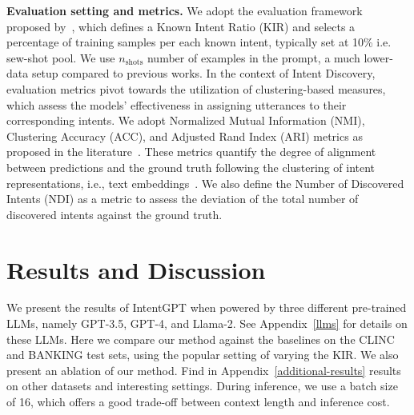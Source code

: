 \documentclass[11pt]{article}
\begin{document}
\vspace{3px}
\textbf{Evaluation setting and metrics.} We adopt the evaluation framework proposed by~\citet{zhang2021discovering}, which defines a Known Intent Ratio (KIR) and selects a percentage of training samples per each known intent, typically set at 10\% i.e. sew-shot pool. We use $n_{\text{shots}}$ number of examples in the prompt, a much lower-data setup compared to previous works. In the context of Intent Discovery, evaluation metrics pivot towards the utilization of clustering-based measures, which assess the models' effectiveness in assigning utterances to their corresponding intents. We adopt Normalized Mutual Information (NMI), Clustering Accuracy (ACC), and Adjusted Rand Index (ARI) metrics as proposed in the literature~\citep{kumar2022intent}. These metrics quantify the degree of alignment between predictions and the ground truth following the clustering of intent representations, i.e., text embeddings~\cite{lin2020discovering}. We also define the Number of Discovered Intents (NDI) as a metric to assess the deviation of the total number of discovered intents against the ground truth.

\section{Results and Discussion}\label{results}
We present the results of IntentGPT when powered by three different pre-trained LLMs, namely GPT-3.5, GPT-4, and Llama-2. See Appendix~\ref{llms} for details on these LLMs. Here we compare our method against the baselines on the CLINC and BANKING test sets, using the popular setting of varying the KIR. We also present an ablation of our method. Find in Appendix~\ref{additional-results} results on other datasets and interesting settings. During inference, we use a batch size of 16, which offers a good trade-off between context length and inference cost.
\end{document}
